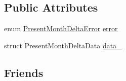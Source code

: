 \subsection*{\-Public \-Attributes}
\begin{DoxyCompactItemize}
\item 
enum \hyperlink{month-delta_8h_aee28c4c9b4054448713e954a7944cb51}{\-Present\-Month\-Delta\-Error} \hyperlink{structMonthDelta_a437eb7cd23ab33a773a8fb97b5923454}{error}
\item 
struct \-Present\-Month\-Delta\-Data \hyperlink{structMonthDelta_a428f2591ca57d192424b298f95c87978}{data\-\_\-}
\end{DoxyCompactItemize}
\subsection*{\-Friends}
